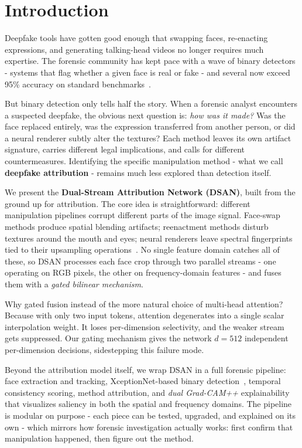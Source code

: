 \section{Introduction}

Deepfake tools have gotten good enough that swapping faces, re-enacting expressions, and generating talking-head videos no longer requires much expertise. The forensic community has kept pace with a wave of binary detectors - systems that flag whether a given face is real or fake - and several now exceed 95\% accuracy on standard benchmarks~\cite{rossler2019faceforensics}.

But binary detection only tells half the story. When a forensic analyst encounters a suspected deepfake, the obvious next question is: \textit{how was it made?} Was the face replaced entirely, was the expression transferred from another person, or did a neural renderer subtly alter the textures? Each method leaves its own artifact signature, carries different legal implications, and calls for different countermeasures. Identifying the specific manipulation method - what we call \textbf{deepfake attribution} - remains much less explored than detection itself.

We present the \textbf{Dual-Stream Attribution Network (DSAN)}, built from the ground up for attribution. The core idea is straightforward: different manipulation pipelines corrupt different parts of the image signal. Face-swap methods produce spatial blending artifacts; reenactment methods disturb textures around the mouth and eyes; neural renderers leave spectral fingerprints tied to their upsampling operations~\cite{frank2020leveraging}. No single feature domain catches all of these, so DSAN processes each face crop through two parallel streams - one operating on RGB pixels, the other on frequency-domain features - and fuses them with a \textit{gated bilinear mechanism}.

Why gated fusion instead of the more natural choice of multi-head attention? Because with only two input tokens, attention degenerates into a single scalar interpolation weight. It loses per-dimension selectivity, and the weaker stream gets suppressed. Our gating mechanism gives the network $d = 512$ independent per-dimension decisions, sidestepping this failure mode.

Beyond the attribution model itself, we wrap DSAN in a full forensic pipeline: face extraction and tracking, XceptionNet-based binary detection~\cite{chollet2017xception}, temporal consistency scoring, method attribution, and \textit{dual Grad-CAM++} explainability~\cite{chattopadhay2018gradcampp} that visualizes saliency in both the spatial and frequency domains. The pipeline is modular on purpose - each piece can be tested, upgraded, and explained on its own - which mirrors how forensic investigation actually works: first confirm that manipulation happened, then figure out the method.

